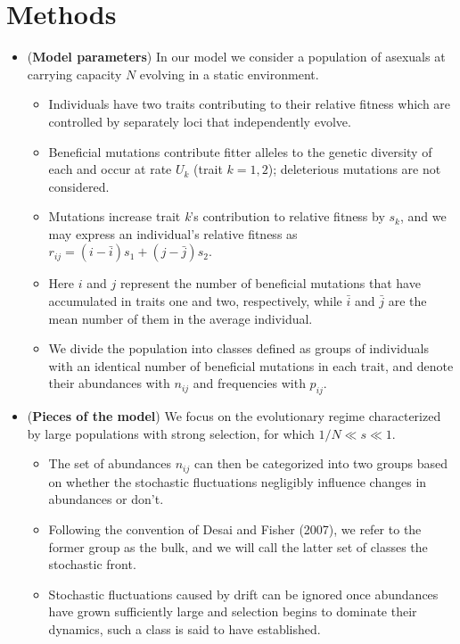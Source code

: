 \documentclass[11pt,one column]{article}
\begin{document}
\section*{Methods}
\begin{itemize}
\item (\textbf{Model parameters}) In our model we consider a population of asexuals at carrying capacity $N$ evolving in a static environment.
	\begin{itemize}
	\item Individuals have two traits contributing to their relative fitness which are controlled by separately loci that independently evolve.
	\item Beneficial mutations contribute fitter alleles to the genetic diversity of each and occur at rate $U_k$ (trait $k=1,2$); deleterious mutations are not considered.
	\item Mutations increase trait \textit{k}'s contribution to relative fitness by $s_k$, and we may express an individual's relative fitness as $r_{ij} = (i-\bar{i} ) s_1+(j-\bar{j} ) s_2$.
	\item Here $i$ and $j$ represent the number of beneficial mutations that have accumulated in traits one and two, respectively, while $\bar{i}$ and $\bar{j}$ are the mean number of them in the average individual.
	\item We divide the population into classes defined as groups of individuals with an identical number of beneficial mutations in each trait, and denote their abundances with $n_{ij}$ and frequencies with $p_{ij}$.
	\end{itemize}	
\item (\textbf{Pieces of the model}) We focus on the evolutionary regime characterized by large populations with strong selection, for which $1/N \ll s \ll 1$.
	\begin{itemize}
	\item The set of abundances $n_{ij}$ can then be categorized into two groups based on whether the stochastic fluctuations negligibly influence changes in abundances or don't. 
	\item Following the convention of Desai and Fisher (2007), we refer to the former group as the bulk, and we will call the latter set of classes the stochastic front.
	\item Stochastic fluctuations caused by drift can be ignored once abundances have grown sufficiently large and selection begins to dominate their dynamics, such a class is said to have established.
	\end{itemize}

\end{itemize}
\end{document}
